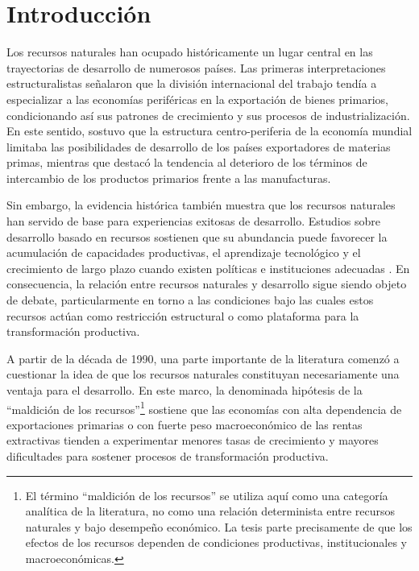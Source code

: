 \documentclass[../../TFM.tex]{subfiles}
\begin{document}
	\chapter{Introducción}
	\label{chap:introduccion}

	Los recursos naturales han ocupado históricamente un lugar central en las trayectorias de desarrollo de numerosos países. Las primeras interpretaciones estructuralistas señalaron que la división internacional del trabajo tendía a especializar a las economías periféricas en la exportación de bienes primarios, condicionando así sus patrones de crecimiento y sus procesos de industrialización. En este sentido, \textcite{Prebisch1962} sostuvo que la estructura centro-periferia de la economía mundial limitaba las posibilidades de desarrollo de los países exportadores de materias primas, mientras que \textcite{Singer1975} destacó la tendencia al deterioro de los términos de intercambio de los productos primarios frente a las manufacturas.

	Sin embargo, la evidencia histórica también muestra que los recursos naturales han servido de base para experiencias exitosas de desarrollo. Estudios sobre desarrollo basado en recursos sostienen que su abundancia puede favorecer la acumulación de capacidades productivas, el aprendizaje tecnológico y el crecimiento de largo plazo cuando existen políticas e instituciones adecuadas \parencite{Wright2004,Ville2013}. En consecuencia, la relación entre recursos naturales y desarrollo sigue siendo objeto de debate, particularmente en torno a las condiciones bajo las cuales estos recursos actúan como restricción estructural o como plataforma para la transformación productiva.

	A partir de la década de 1990, una parte importante de la literatura comenzó a cuestionar la idea de que los recursos naturales constituyan necesariamente una ventaja para el desarrollo. En este marco, la denominada hipótesis de la ``maldición de los recursos''\footnote{El término ``maldición de los recursos'' se utiliza aquí como una categoría analítica de la literatura, no como una relación determinista entre recursos naturales y bajo desempeño económico. La tesis parte precisamente de que los efectos de los recursos dependen de condiciones productivas, institucionales y macroeconómicas.} sostiene que las economías con alta dependencia de exportaciones primarias o con fuerte peso macroeconómico de las rentas extractivas tienden a experimentar menores tasas de crecimiento y mayores dificultades para sostener procesos de transformación productiva.
\end{document}
